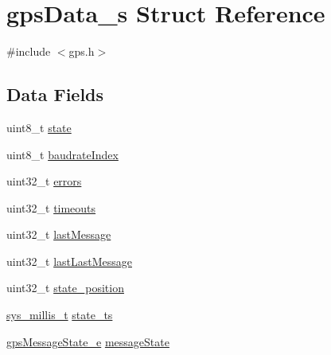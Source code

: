\hypertarget{structgpsData__s}{\section{gps\+Data\+\_\+s Struct Reference}
\label{structgpsData__s}
}


{\ttfamily \#include $<$gps.\+h$>$}

\subsection*{Data Fields}
\begin{DoxyCompactItemize}
\item 
uint8\+\_\+t \hyperlink{structgpsData__s_a0c6e93c90d6f278d6df12ab56b0c77ba}{state}
\item 
uint8\+\_\+t \hyperlink{structgpsData__s_a08a791cbbb539a4efe760fa0b51aacb7}{baudrate\+Index}
\item 
uint32\+\_\+t \hyperlink{structgpsData__s_ae0b030039dfaf0e84da4dadf1a67e9b7}{errors}
\item 
uint32\+\_\+t \hyperlink{structgpsData__s_a88b130e1b54e7aa9c5df68d6815a2def}{timeouts}
\item 
uint32\+\_\+t \hyperlink{structgpsData__s_abc2469d7c5daadea553f5e8b04447b75}{last\+Message}
\item 
uint32\+\_\+t \hyperlink{structgpsData__s_a0ae01f478ac015995ae79d2c340349dc}{last\+Last\+Message}
\item 
uint32\+\_\+t \hyperlink{structgpsData__s_a2fc182c3d302ef43771ff6d2b7c5d104}{state\+\_\+position}
\item 
\hyperlink{system__calls_8h_a62a9a2e72861132c17d4d4b29bb8b80a}{sys\+\_\+millis\+\_\+t} \hyperlink{structgpsData__s_a607e8e85fe017ebd8ed6280e90812b9f}{state\+\_\+ts}
\item 
\hyperlink{sensors_2gps_8h_aa0c000aa5d6dd13e56689e3947bbe254}{gps\+Message\+State\+\_\+e} \hyperlink{structgpsData__s_a013550da227372417ab35b2a07169141}{message\+State}
\end{DoxyCompactItemize}


